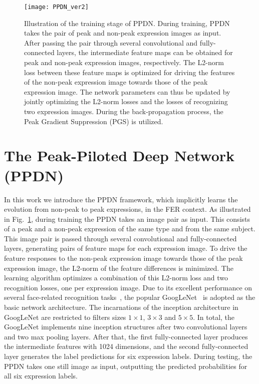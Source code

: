 \documentclass[runningheads]{llncs}
\begin{document}
\begin{figure}[t]
	\centering
	\texttt{[image: PPDN\_ver2]}
	\caption{Illustration of the training stage of PPDN. During training, PPDN takes the pair of peak and non-peak expression images as input. After passing the pair through several convolutional and fully-connected layers, the intermediate feature maps can be obtained for peak and non-peak expression images, respectively. The L2-norm loss between these feature maps is optimized for driving the features of the non-peak expression image towards those of the peak expression image. The network parameters can thus be updated by jointly optimizing the L2-norm losses and the losses of recognizing two expression images. During the back-propagation process, the Peak Gradient Suppression (PGS) is utilized.}
	\label{fig:architecture}
\end{figure}


\section{The Peak-Piloted Deep Network (PPDN)}


In this work we introduce the PPDN framework, which implicitly learns 
the evolution from non-peak to peak expressions, in
the FER context. As illustrated in 
Fig.~\ref{fig:architecture}, during training the PPDN takes an image pair as 
input. This consists of a peak and a non-peak expression of the same 
type and from the same subject. This image pair is passed through several 
convolutional and fully-connected layers, generating pairs of feature 
maps for each expression image. To drive the feature responses to the 
non-peak expression image towards those of the peak expression image, the 
L2-norm of the feature differences is minimized. 
The learning algorithm optimizes a combination of this L2-norm loss
and two recognition losses, one per expression image. 
Due to its excellent performance on several face-related recognition 
tasks~\cite{schroff2015facenet,sun2015deepid3}, the popular 
GoogLeNet~\cite{szegedy2015going} is adopted as the basic 
network architecture. The incarnations of the inception architecture in 
GoogLeNet are restricted to filters sizes $1 \times 1$, $3 \times 3$ and 
$5 \times 5$. In total, the GoogLeNet implements nine inception structures 
after two convolutional layers and two max pooling layers. After that, the 
first fully-connected layer produces the intermediate features with 1024 
dimensions, and the second fully-connected layer generates the label 
predictions for six expression labels. During testing, the PPDN takes one 
still image as input, outputting the predicted probabilities for all six 
expression labels. 
\end{document}
